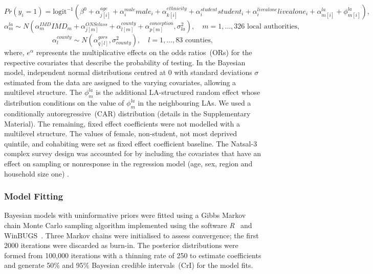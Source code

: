 \documentclass[fleqn,10pt]{wlscirep}
\begin{document}
\begin{equation}
Pr(y_i = 1) = \mbox{logit}^{-1} \left( \beta^0 + \alpha_{j[i]}^{age} + \alpha_i^{male} male_i + \alpha_{k[i]}^{ethnicity} + \alpha_i^{student} student_i + \alpha_i^{livealone} livealone_i + \alpha_{m[i]}^{la} + \phi_{m[i]}^{la} \right),
\end{equation}
\begin{equation}
\alpha_m^{la} \sim N \left( \alpha_m^{IMD} IMD_m + \alpha_{j[m]}^{ONSclass} + \alpha_{l[m]}^{county} + \alpha_{p[m]}^{conception}, \sigma_{la}^2 \right), \quad m = 1,\ldots, 326 \mbox{ local authorities},
\end{equation}
\begin{equation}
\alpha_l^{county} \sim N \left( \alpha_{q[l]}^{gors}, \sigma_{county}^2 \right), \quad l = 1, \ldots, 83 \mbox{ counties},
\end{equation}
\noindent
where, $e^{\alpha}$ represents the multiplicative effects on the odds ratios~(ORs) for the respective covariates that describe the probability of testing. In the Bayesian model, independent normal distributions centred at 0 with standard deviations $\sigma$ estimated from the data are assigned to the varying covariates, allowing a multilevel structure. The $\phi_m^{la}$ is the additional LA-structured random effect whose distribution conditions on the value of $\phi_m^{la}$ in the neighbouring LAs. We used a conditionally autoregressive~(CAR) distribution (details in the Supplementary Material). The remaining, fixed effect coefficients were not modelled with a multilevel structure. The values of female, non-student, not most deprived quintile, and cohabiting were set as fixed effect coefficient baseline.
The Natsal-3 complex survey design was accounted for by including the covariates that have an effect on sampling or nonresponse in the regression model (age, sex, region and household size one) \cite{Gelman2007b}.

\subsubsection*{Model Fitting}
Bayesian models with uninformative priors were fitted using a Gibbs Markov chain Monte Carlo sampling algorithm implemented using the software {\it R}~\cite{RCoreTeam2017} and WinBUGS~\cite{Lunn2000}. Three Markov chains were initialised to assess convergence; the first 2000 iterations were discarded as burn-in. The posterior distributions were formed from 100,000 iterations with a thinning rate of 250 to estimate coefficients and generate 50\% and 95\% Bayesian credible intervals~(CrI) for the model fits.
\end{document}
